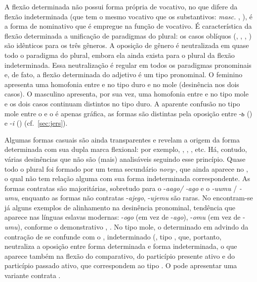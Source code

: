 A flexão determinada não possui forma própria de vocativo, no que difere
da flexão indeterminada (que tem o mesmo vocativo que os substantivos:
\emph{masc.} ,  ), é a forma de
nominativo que é empregue na função de vocativo. É característica da
flexão determinada a unificação de paradigmas do plural: os casos
oblíquos (, , , ) são idênticos
para os três gêneros. 
A oposição de gênero é neutralizada em quase todo o paradigma do plural,
embora ela ainda exista para o plural da flexão indeterminada. Essa
neutralização é regular em todos os paradigmas pronominais e, de fato, a
flexão determinada do adjetivo é um tipo pronominal. O feminino
apresenta uma homofonia entre  e  no tipo duro e no mole
(desinência  nos dois casos). O masculino apresenta,
por sua vez, uma homofonia entre  e  no tipo mole e os
dois casos continuam distintos no tipo duro. A aparente confusão no tipo
mole entre o   e o 
 é apenas gráfica, as formas são distintas pela oposição
entre -\emph{ь} () e -\emph{i} () (cf.~\ref{sec:jers}).

Algumas formas casuais são ainda transparentes e revelam a origem da
forma determinada com sua dupla marca flexional: por exemplo,
 ,  ,
 , 
 etc.
Há, contudo, várias desinências que não são (mais) analisáveis seguindo
esse princípio.
Quase todo o plural foi formado por um tema secundário
\emph{novy-}, que ainda aparece no , o qual não tem relação
alguma com sua forma indeterminada correspondente.
As formas contratas são majoritárias, sobretudo para o 
-\emph{aago/ -ago} e o
 \emph{-uumu} / \emph{-umu}, enquanto as formas não
contratas -\emph{ajego}, -\emph{ujemu} são raras. 
No  encontram-se já alguns exemplos de alinhamento na
desinência pronominal,
tendência que aparece nas línguas eslavas modernas: 
-\emph{ogo} (em vez de -\emph{ago}),  -\emph{omu} (em vez de
-\emph{umu}), conforme o demonstrativo , .
No tipo mole, o  determinado em 
advindo da contração de  se confunde com o
, indeterminado (, tipo
, que, portanto, neutraliza a oposição entre forma
determinada e forma indeterminada, o que aparece também na flexão do
comparativo, do particípio presente ativo e do particípio passado ativo,
que correspondem ao tipo . O  pode
apresentar uma variante contrata .

